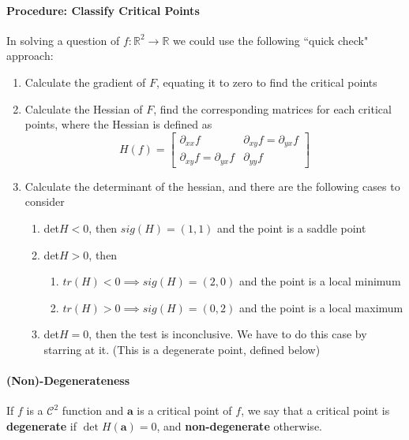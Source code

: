 \documentclass[12pt]{article}
\newcommand{\real}{\mathbb{R}}
\newcommand{\va}{\mathbf{a}}
\begin{document}
\paragraph{Procedure: Classify Critical Points}
In solving a question of $f:\real^2 \rightarrow{} \real$ we could use the following ``quick check" approach:
\begin{enumerate}
    \item Calculate the gradient of $F$, equating it to zero to find the critical points
    \item Calculate the Hessian of $F$, find the corresponding matrices for each critical points, where the Hessian is defined as
    \begin{equation*} H(f) = 
        \begin{bmatrix}
             \partial_{xx}f & \partial_{xy}f = \partial_{yx}f \\
             \partial_{xy}f = \partial_{yx}f & \partial_{yy}f
        \end{bmatrix}
    \end{equation*}
    \item Calculate the determinant of the hessian, and there are the following cases to consider
    \begin{enumerate}
        \item det$H<0$, then $sig(H) = (1,1)$ and the point is a saddle point
        \item det$H>0$, then
            \begin{enumerate}
                \item $tr(H)<0 \implies sig(H) = (2,0)$ and the point is a local minimum
                \item $tr(H)>0 \implies sig(H) = (0,2)$ and the point is a local maximum
            \end{enumerate}
        \item det$H=0$, then the test is inconclusive. We have to do this case by starring at it. (This is a degenerate point, defined below)
    \end{enumerate}
\end{enumerate}

\paragraph{(Non)-Degenerateness} If $f$ is a $\mathcal{C}^2$ function and $\va$ is a critical point of $f$, we say that a critical point is \textbf{degenerate} if $\det H(\va) = 0$, and \textbf{non-degenerate} otherwise.
\end{document}
